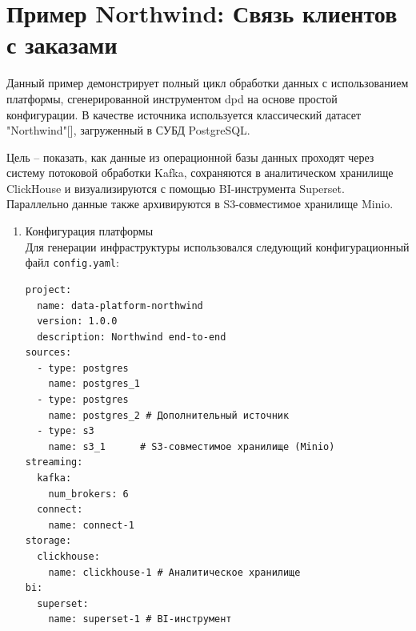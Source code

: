 \section{Пример Northwind: Связь клиентов с заказами} \label{ch4:northwind}
Данный пример демонстрирует полный цикл обработки данных с использованием платформы, сгенерированной инструментом dpd на основе простой конфигурации. В качестве источника используется классический датасет "Northwind"[], загруженный в СУБД PostgreSQL.

Цель – показать, как данные из операционной базы данных проходят через систему потоковой обработки Kafka, сохраняются в аналитическом хранилище ClickHouse и визуализируются с помощью BI-инструмента Superset. Параллельно данные также архивируются в S3-совместимое хранилище Minio.

\begin{enumerate}[1.]
    \item Конфигурация платформы\\
          Для генерации инфраструктуры использовался следующий конфигурационный файл \texttt{config.yaml}:
          \begin{verbatim}
project:
  name: data-platform-northwind 
  version: 1.0.0
  description: Northwind end-to-end
sources:
  - type: postgres
    name: postgres_1
  - type: postgres
    name: postgres_2 # Дополнительный источник
  - type: s3
    name: s3_1      # S3-совместимое хранилище (Minio)
streaming:
  kafka:
    num_brokers: 6
  connect:
    name: connect-1 
storage:
  clickhouse:
    name: clickhouse-1 # Аналитическое хранилище
bi:
  superset:
    name: superset-1 # BI-инструмент  
\end{verbatim}


\end{enumerate}
